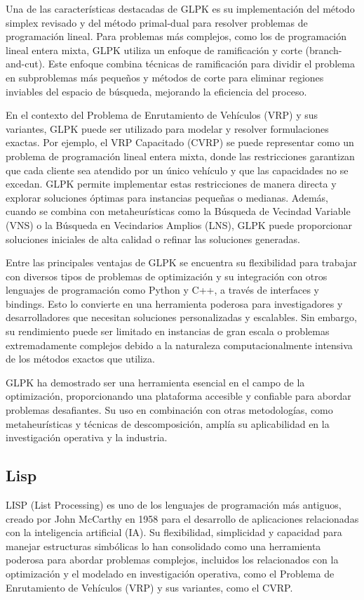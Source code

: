 \documentclass{article}
\begin{document}
Una de las características destacadas de GLPK es su implementación del método simplex revisado y del método primal-dual para resolver problemas de programación lineal. Para problemas más complejos, como los de programación lineal entera mixta, GLPK utiliza un enfoque de ramificación y corte (branch-and-cut). Este enfoque combina técnicas de ramificación para dividir el problema en subproblemas más pequeños y métodos de corte para eliminar regiones inviables del espacio de búsqueda, mejorando la eficiencia del proceso.

En el contexto del Problema de Enrutamiento de Vehículos (VRP) y sus variantes, GLPK puede ser utilizado para modelar y resolver formulaciones exactas. Por ejemplo, el VRP Capacitado (CVRP) se puede representar como un problema de programación lineal entera mixta, donde las restricciones garantizan que cada cliente sea atendido por un único vehículo y que las capacidades no se excedan. GLPK permite implementar estas restricciones de manera directa y explorar soluciones óptimas para instancias pequeñas o medianas. Además, cuando se combina con metaheurísticas como la Búsqueda de Vecindad Variable (VNS) o la Búsqueda en Vecindarios Amplios (LNS), GLPK puede proporcionar soluciones iniciales de alta calidad o refinar las soluciones generadas.

Entre las principales ventajas de GLPK se encuentra su flexibilidad para trabajar con diversos tipos de problemas de optimización y su integración con otros lenguajes de programación como Python y C++, a través de interfaces y bindings. Esto lo convierte en una herramienta poderosa para investigadores y desarrolladores que necesitan soluciones personalizadas y escalables. Sin embargo, su rendimiento puede ser limitado en instancias de gran escala o problemas extremadamente complejos debido a la naturaleza computacionalmente intensiva de los métodos exactos que utiliza.

GLPK ha demostrado ser una herramienta esencial en el campo de la optimización, proporcionando una plataforma accesible y confiable para abordar problemas desafiantes. Su uso en combinación con otras metodologías, como metaheurísticas y técnicas de descomposición, amplía su aplicabilidad en la investigación operativa y la industria.

\subsection{Lisp}
LISP (List Processing) es uno de los lenguajes de programación más antiguos, creado por John McCarthy en 1958 para el desarrollo de aplicaciones relacionadas con la inteligencia artificial (IA). Su flexibilidad, simplicidad y capacidad para manejar estructuras simbólicas lo han consolidado como una herramienta poderosa para abordar problemas complejos, incluidos los relacionados con la optimización y el modelado en investigación operativa, como el Problema de Enrutamiento de Vehículos (VRP) y sus variantes, como el CVRP.
\end{document}
